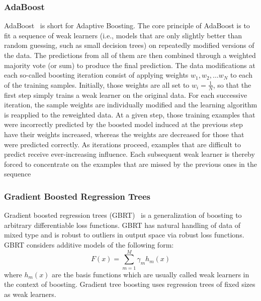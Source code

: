 \subsubsection{AdaBoost}
\label{ssub:adaboost}
AdaBoost~\cite{collins2002} is short for Adaptive Boosting.
The core principle of AdaBoost is to fit a sequence of weak learners (i.e., models that are only slightly better than random guessing, such as small decision trees) on repeatedly modified versions of the data. 
The predictions from all of them are then combined through a weighted majority vote (or sum) to produce the final prediction. 
The data modifications at each so-called boosting iteration consist of applying weights $w_1, w_2, \ldots w_N$ to each of the training samples. 
Initially, those weights are all set to $w_i = \frac{1}{N}$, so that the first step simply trains a weak learner on the original data. 
For each successive iteration, the sample weights are individually modified and the learning algorithm is reapplied to the reweighted data. 
At a given step, those training examples that were incorrectly predicted by the boosted model induced at the previous step have their weights increased, whereas the weights are decreased for those that were predicted correctly. 
As iterations proceed, examples that are difficult to predict receive ever-increasing influence. 
Each subsequent weak learner is thereby forced to concentrate on the examples that are missed by the previous ones in the sequence

\subsubsection{Gradient Boosted Regression Trees}
\label{ssub:gradient_boost}
Gradient boosted regression trees (GBRT)~\cite{friedman2001} is a generalization of boosting to arbitrary differentiable loss functions.
GBRT has natural handling of data of mixed type and is robust to outliers in output space via robust loss functions.
GBRT considers additive models of the following form:
\begin{equation}
	F(x) = \sum\limits_{m=1}^{M} \gamma_m h_m(x)
\end{equation}
where $h_m(x)$ are the basis functions which are usually called weak learners in the context of boosting.
Gradient tree boosting uses regression trees of fixed sizes as weak learners.

